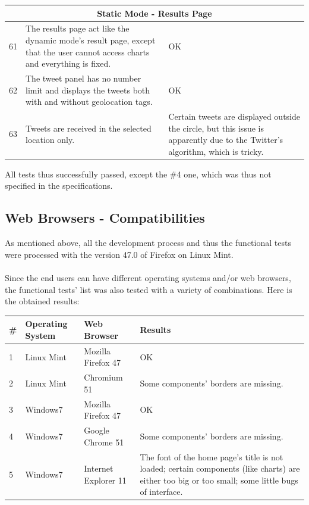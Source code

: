 \documentclass[a4paper,11pt]{report}
\begin{document}
\begin{center}
\begin{longtable}{|l|p{10cm}|p{4.4cm}|}
	\multicolumn{3}{|c|}{\textbf{Static Mode - Results Page}}\\\hline
	61 & The results page act like the dynamic mode's result page, except that the user cannot access charts and everything is fixed. & \color{ForestGreen}OK\color{black}\\\hline
	62 & The tweet panel has no number limit and displays the tweets both with and without geolocation tags. & \color{ForestGreen}OK\color{black}\\\hline
	63 & Tweets are received in the selected location only. & \color{Orange}Certain tweets are displayed outside the circle, but this issue is apparently due to the Twitter's algorithm, which is tricky.\color{black}\\\hline
\end{longtable}
\end{center}
\vspace{-20pt}

All tests thus successfully passed, except the \#4 one, which was thus not specified in the specifications.

\subsection{Web Browsers - Compatibilities}
\label{webBrowsersCompatibilities}
As mentioned above, all the development process and thus the functional tests were processed with the version 47.0 of Firefox on Linux Mint.\\\\
Since the end users can have different operating systems and/or web browsers, the functional tests' list was also tested with a variety of combinations. Here is the obtained results:
\begin{center}
\def\arraystretch{1.5}
\begin{longtable}{|l|l|l|p{7cm}|}\hline
	\textbf{\#} & \textbf{Operating System} & \textbf{Web Browser} & \textbf{Results}\\\hline \endhead
	1 & Linux Mint & Mozilla Firefox 47 & \color{ForestGreen}OK\color{black}\\\hline
	2 & Linux Mint & Chromium 51 & \color{ForestGreen}Some components' borders are missing.\color{black}\\\hline
	3 & Windows7 & Mozilla Firefox 47 & \color{ForestGreen}OK\color{black}\\\hline
	4 & Windows7 & Google Chrome 51 & \color{ForestGreen}Some components' borders are missing.\color{black}\\\hline
	5 & Windows7 & Internet Explorer 11 & \color{ForestGreen}The font of the home page's title is not loaded; certain components  (like charts) are either too big or too small; some little bugs of interface.\color{black}\\\hline	
\end{longtable}
\end{center}
\vspace{-20pt}
\end{document}
